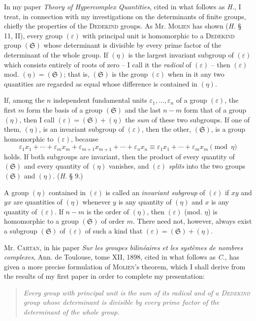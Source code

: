 \documentclass[11pt]{article}
\newcommand{\eps}{\varepsilon}
\newcommand{\grS}{\mathfrak{S}}
\begin{document}
In my paper \emph{Theory of Hypercomplex Quantities}, cited in what follows as \emph{H.}, I treat, in connection with my investigations on the determinants of finite groups, chiefly the properties of the \textsc{Dedekind} groups. As Mr. \textsc{Molien} has shown (\emph{H.} § 11, II), every group $(\eps)$ with principal unit is homomorphic to a \textsc{Dedekind} group $(\grS)$ whose determinant is divisible by every prime factor of the determinant of the whole group. If $(\eta)$ is the largest invariant subgroup of $(\eps)$ which consists entirely of roots of zero -- I call it the \emph{radical} of $(\eps)$ -- then $(\eps)$ mod. $(\eta)=(\grS)$; that is, $(\grS)$ is the group $(\eps)$ when in it any two quantities are regarded as equal whose difference is contained in $(\eta)$.

If, among the $n$ independent fundamental units $\eps_1,\ldots,\eps_n$ of a group $(\eps)$, the first $m$ form the basis of a group $(\grS)$ and the last $n-m$ form that of a group $(\eta)$, then I call $(\eps)=(\grS)+(\eta)$ the \emph{sum} of these two subgroups. If one of them, $(\eta)$, is an invariant subgroup of $(\eps)$, then the other, $(\grS)$, is a group homomorphic to $(\eps)$, because
\[
 \eps_1x_1+\cdots+\eps_mx_m+\eps_{m+1}x_{m+1}+\cdots+\eps_nx_n
 \equiv \eps_1x_1+\cdots+\eps_mx_m \pmod{\eta}
\]
holds. If both subgroups are invariant, then the product of every quantity of $(\grS)$ and every quantity of $(\eta)$ vanishes, and $(\eps)$ \emph{splits} into the two groups $(\grS)$ and $(\eta)$. (\emph{H.} § 9.)

A group $(\eta)$ contained in $(\eps)$ is called an \emph{invariant subgroup} of $(\eps)$ if $xy$ and $yx$ are quantities of $(\eta)$ whenever $y$ is any quantity of $(\eta)$ and $x$ is any quantity of $(\eps)$. If $n-m$ is the order of $(\eta)$, then $(\eps)$ (mod. $\eta$) is homomorphic to a group $(\grS)$ of order $m$. There need not, however, always exist a subgroup $(\grS)$ of $(\eps)$ of such a kind that $(\eps)=(\grS)+(\eta)$.

Mr. \textsc{Cartan}, in his paper \emph{Sur les groupes bilinéaires et les systèmes de nombres complexes}, Ann. de Toulouse, tome XII, 1898, cited in what follows as \emph{C.}, has given a more precise formulation of \textsc{Molien}'s theorem, which I shall derive from the results of my first paper in order to complete my presentation:

\begin{quote}\itshape
Every group with principal unit is the sum of its radical and of a {\normalfont\textsc{Dedekind}} group whose determinant is divisible by every prime factor of the determinant of the whole group.
\end{quote}
\end{document}
